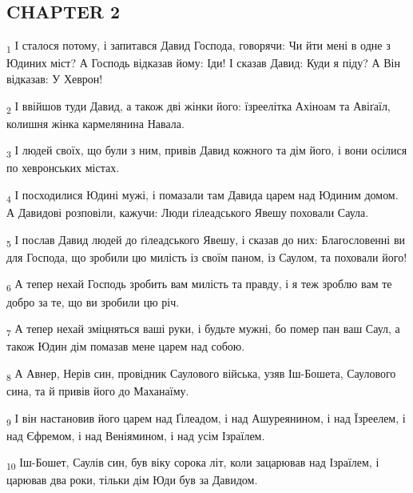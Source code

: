 \subsection{CHAPTER 2}
\begin{tcolorbox}
\textsubscript{1} І сталося потому, і запитався Давид Господа, говорячи: Чи йти мені в одне з Юдиних міст? А Господь відказав йому: Іди! І сказав Давид: Куди я піду? А Він відказав: У Хеврон!
\end{tcolorbox}
\begin{tcolorbox}
\textsubscript{2} І ввійшов туди Давид, а також дві жінки його: їзреелітка Ахіноам та Авіґаїл, колишня жінка кармелянина Навала.
\end{tcolorbox}
\begin{tcolorbox}
\textsubscript{3} І людей своїх, що були з ним, привів Давид кожного та дім його, і вони осілися по хевронських містах.
\end{tcolorbox}
\begin{tcolorbox}
\textsubscript{4} І посходилися Юдині мужі, і помазали там Давида царем над Юдиним домом. А Давидові розповіли, кажучи: Люди ґілеадського Явешу поховали Саула.
\end{tcolorbox}
\begin{tcolorbox}
\textsubscript{5} І послав Давид людей до ґілеадського Явешу, і сказав до них: Благословенні ви для Господа, що зробили цю милість із своїм паном, із Саулом, та поховали його!
\end{tcolorbox}
\begin{tcolorbox}
\textsubscript{6} А тепер нехай Господь зробить вам милість та правду, і я теж зроблю вам те добро за те, що ви зробили цю річ.
\end{tcolorbox}
\begin{tcolorbox}
\textsubscript{7} А тепер нехай зміцняться ваші руки, і будьте мужні, бо помер пан ваш Саул, а також Юдин дім помазав мене царем над собою.
\end{tcolorbox}
\begin{tcolorbox}
\textsubscript{8} А Авнер, Нерів син, провідник Саулового війська, узяв Іш-Бошета, Саулового сина, та й привів його до Маханаїму.
\end{tcolorbox}
\begin{tcolorbox}
\textsubscript{9} І він настановив його царем над Ґілеадом, і над Ашуреянином, і над Їзреелем, і над Єфремом, і над Веніямином, і над усім Ізраїлем.
\end{tcolorbox}
\begin{tcolorbox}
\textsubscript{10} Іш-Бошет, Саулів син, був віку сорока літ, коли зацарював над Ізраїлем, і царював два роки, тільки дім Юди був за Давидом.
\end{tcolorbox}
